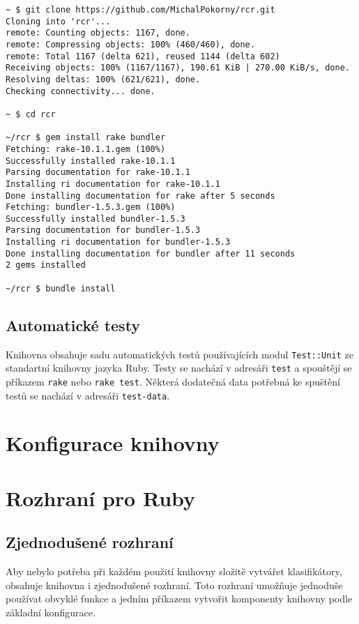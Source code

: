 \documentclass[a4paper]{article}
\begin{document}
\begin{lstlisting}
~ $ git clone https://github.com/MichalPokorny/rcr.git
Cloning into 'rcr'...
remote: Counting objects: 1167, done.
remote: Compressing objects: 100% (460/460), done.
remote: Total 1167 (delta 621), reused 1144 (delta 602)
Receiving objects: 100% (1167/1167), 190.61 KiB | 270.00 KiB/s, done.
Resolving deltas: 100% (621/621), done.
Checking connectivity... done.

~ $ cd rcr

~/rcr $ gem install rake bundler
Fetching: rake-10.1.1.gem (100%)
Successfully installed rake-10.1.1
Parsing documentation for rake-10.1.1
Installing ri documentation for rake-10.1.1
Done installing documentation for rake after 5 seconds
Fetching: bundler-1.5.3.gem (100%)
Successfully installed bundler-1.5.3
Parsing documentation for bundler-1.5.3
Installing ri documentation for bundler-1.5.3
Done installing documentation for bundler after 11 seconds
2 gems installed

~/rcr $ bundle install
\end{lstlisting}

\subsection{Automatické testy}
Knihovna obsahuje sadu automatických testů používajících modul
\texttt{Test::Unit} ze standartní knihovny jazyka Ruby.
Testy se nachází v adresáři \texttt{test} a spouštějí se příkazem
\texttt{rake} nebo \texttt{rake test}. Některá dodatečná data potřebná
ke spuštění testů se nachází v adresáři \texttt{test-data}.

\section{Konfigurace knihovny}

\section{Rozhraní pro Ruby}

\subsection{Zjednodušené rozhraní}
Aby nebylo potřeba při každém použití knihovny složitě vytvářet klasifikátory,
obsahuje knihovna i zjednodušené rozhraní. Toto rozhraní umožňuje jednoduše
používat obvyklé funkce a jedním příkazem vytvořit komponenty knihovny podle
základní konfigurace.
\end{document}
